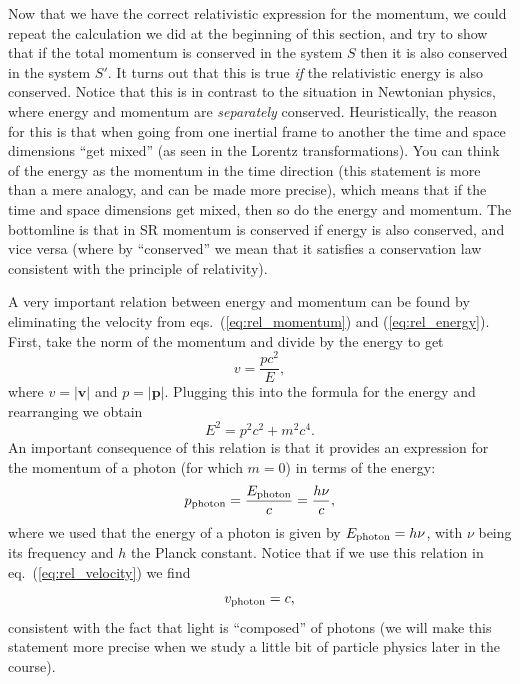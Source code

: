 \documentclass[11pt, a4paper,oneside,openright]{book}
\numberwithin{equation}{section}
\begin{document}
Now that we have the correct relativistic expression for the momentum, we could repeat the calculation we did at the beginning of this section, and try to show that if the total momentum is conserved in the system $S$ then it is also conserved in the system $S'$. It turns out that this is true {\it if} the relativistic energy is also conserved. Notice that this is in contrast to the situation in Newtonian physics, where energy and momentum are {\it separately} conserved. Heuristically, the reason for this is that when going from one inertial frame to another the time and space dimensions ``get mixed'' (as seen in the Lorentz transformations). You can think of the energy as the momentum in the time direction (this statement is more than a mere analogy, and can be made more precise), which means that if the time and space dimensions get mixed, then so do the energy and momentum. The bottomline is that in SR momentum is conserved if energy is also conserved, and vice versa (where by ``conserved'' we mean that 
it satisfies a conservation law consistent with the principle of relativity).

A very important relation between energy and momentum can be found by eliminating the velocity from eqs.\ (\ref{eq:rel_momentum}) and (\ref{eq:rel_energy}). First, take the norm of the momentum and divide by the energy to get
\begin{equation} \label{eq:rel_velocity}
v=\frac{pc^2}{E},
\end{equation}
where $v=|\mathbf{v}|$ and $p=|\mathbf{p}|$. Plugging this into the formula for the energy and rearranging we obtain
\begin{equation}
E^2=p^2c^2+m^2c^4.
\end{equation}
An important consequence of this relation is that it provides an expression for the momentum of a photon (for which $m=0$) in terms of the energy:
\begin{equation}
p_{\rm photon}=\frac{E_{\rm photon}}{c}=\frac{h\nu}{c},
\end{equation}
where we used that the energy of a photon is given by $E_{\rm photon}=h\nu$, with $\nu$ being its frequency and $h$ the Planck constant. Notice that if we use this relation in eq.\ (\ref{eq:rel_velocity}) we find
\begin{equation}
v_{\rm photon}=c,
\end{equation}
consistent with the fact that light is ``composed'' of photons (we will make this statement more precise when we study a little bit of particle physics later in the course).
\end{document}
